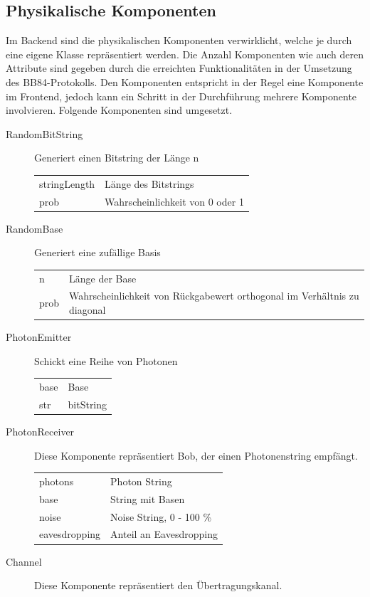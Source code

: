 \documentclass[a4paper,10.2pt,pdftex]{scrartcl}%
\begin{document}
\subsection{Physikalische Komponenten}
Im Backend sind die physikalischen Komponenten verwirklicht, welche je durch eine eigene Klasse repräsentiert werden. Die Anzahl Komponenten wie auch deren Attribute sind gegeben durch die erreichten Funktionalitäten in der Umsetzung des BB84-Protokolls. Den Komponenten entspricht in der Regel eine Komponente im Frontend, jedoch kann ein Schritt in der Durchführung mehrere Komponente involvieren. Folgende Komponenten sind umgesetzt.
\begin{description} 
\item[RandomBitString] Generiert einen Bitstring der Länge n \\
\begin{tabular}{p{3cm}p{9cm}}
stringLength & Länge des Bitstrings \\
prob & Wahrscheinlichkeit von 0 oder 1 \\
\end{tabular}
\item[RandomBase]  Generiert eine zufällige Basis \\
\begin{tabular}{p{3cm}p{7.5cm}}
n & Länge der Base \\    
prob & Wahrscheinlichkeit von Rückgabewert orthogonal im Verhältnis zu diagonal
\end{tabular} 
\item[PhotonEmitter] Schickt eine Reihe von Photonen  \\
\begin{tabular}{p{3cm}p{9cm}}
base & Base \\
str & bitString \\  
\end{tabular}
\item[PhotonReceiver]
Diese Komponente repräsentiert Bob, der einen Photonenstring empfängt.  \\
\begin{tabular}{p{3cm}p{7.5cm}}
photons & Photon String   \\
base  & String mit Basen  \\
noise &  Noise String, 0 - 100  \% \\ 
eavesdropping  & Anteil an Eavesdropping 
\end{tabular} 
\item[Channel] 
Diese Komponente repräsentiert den Übertragungskanal. \\

\end{description}
\end{document}
